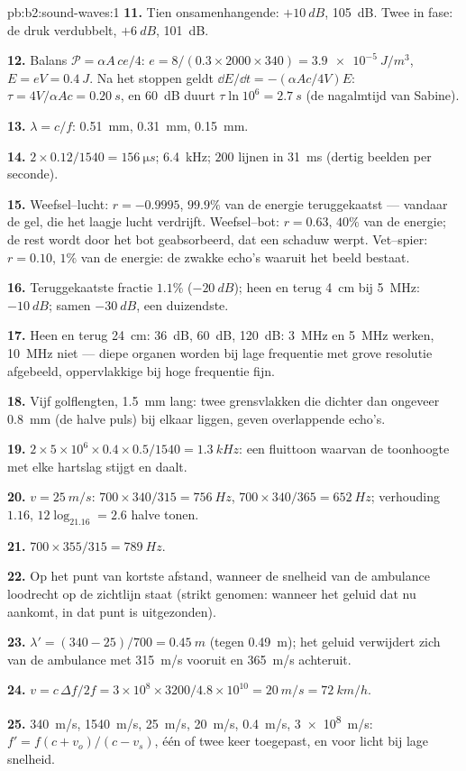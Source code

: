 \begin{solution}{pb:b2:sound-waves:1}
\textbf{11.} Tien onsamenhangende: $+\qty{10}{dB}$, \qty{105}{dB}. Twee in
fase: de druk verdubbelt, $+\qty{6}{dB}$, \qty{101}{dB}.

\textbf{12.} Balans $\mathcal P = \alpha A\,ce/4$:
$e = 8/(0.3 \times 2000 \times 340) =
\qty{3.9e-5}{J/m^3}$,
$E = eV = \qty{0.4}{J}$. Na het stoppen geldt
$\dd E/\dd t = -(\alpha Ac
/4V)E$: $\tau = 4V/\alpha Ac = \qty{0.20}{s}$, en
\qty{60}{dB} duurt $\tau\ln10^6 =
\qty{2.7}{s}$ (de nagalmtijd van Sabine).

\textbf{13.} $\lambda = c/f$: \qty{0.51}{mm}, \qty{0.31}{mm}, \qty{0.15}{mm}.

\textbf{14.} $2 \times 0.12/1540 = \qty{156}{\micro s}$; \qty{6.4}{kHz};
$200$ lijnen in \qty{31}{ms} (dertig beelden per seconde).

\textbf{15.} Weefsel--lucht: $r = -0.9995$, $99.9\%$ van de energie
teruggekaatst --- vandaar de gel, die het laagje lucht verdrijft.
Weefsel--bot: $r = 0.63$, $40\%$ van de energie; de rest wordt door het bot
geabsorbeerd, dat een schaduw werpt. Vet--spier: $r = 0.10$, $1\%$ van de
energie: de zwakke echo's waaruit het beeld bestaat.

\textbf{16.} Teruggekaatste fractie $1.1\%$ ($-\qty{20}{dB}$); heen en terug
\qty{4}{cm} bij \qty{5}{MHz}: $-\qty{10}{dB}$; samen $-\qty{30}{dB}$, een
duizendste.

\textbf{17.} Heen en terug \qty{24}{cm}: \qty{36}{dB}, \qty{60}{dB},
\qty{120}{dB}: \qty{3}{MHz} en \qty{5}{MHz} werken, \qty{10}{MHz} niet ---
diepe organen worden bij lage frequentie met grove resolutie afgebeeld,
oppervlakkige bij hoge frequentie fijn.

\textbf{18.} Vijf golflengten, \qty{1.5}{mm} lang: twee grensvlakken die
dichter dan ongeveer \qty{0.8}{mm} (de halve puls) bij elkaar liggen, geven
overlappende echo's.

\textbf{19.}
$2 \times 5 \times 10^6 \times 0.4 \times 0.5/1540 = \qty{1.3}{kHz}$: een
fluittoon waarvan de toonhoogte met elke hartslag stijgt en daalt.

\textbf{20.} $v = \qty{25}{m/s}$: $700 \times 340/315 = \qty{756}{Hz}$,
$700 \times 340/365 =
\qty{652}{Hz}$; verhouding $1.16$,
$12\log_21.16 = 2.6$ halve tonen.

\textbf{21.} $700 \times 355/315 = \qty{789}{Hz}$.

\textbf{22.} Op het punt van kortste afstand, wanneer de snelheid van de
ambulance loodrecht op de zichtlijn staat (strikt genomen: wanneer het
geluid dat nu aankomt, in dat punt is uitgezonden).

\textbf{23.} $\lambda' = (340 - 25)/700 = \qty{0.45}{m}$ (tegen
\qty{0.49}{m}); het geluid verwijdert zich van de ambulance met
\qty{315}{m/s} vooruit en \qty{365}{m/s} achteruit.

\textbf{24.}
$v = c\,\Delta f/2f = 3 \times 10^8 \times 3200/4.8 \times 10^{10} = \qty{20}{m/s} =
\qty{72}{km/h}$.

\textbf{25.} \qty{340}{m/s}, \qty{1540}{m/s}, \qty{25}{m/s}, \qty{20}{m/s},
\qty{0.4}{m/s}, \qty{3e8}{m/s}: $f' = f(c + v_o)/(c - v_s)$, één of twee
keer toegepast, en voor licht bij lage snelheid.
\end{solution}
